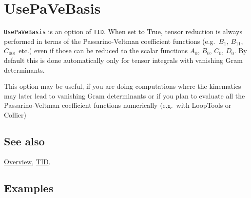 \documentclass[../FeynCalcManual.tex]{subfiles}
\begin{document}
\hypertarget{usepavebasis}{%
\section{UsePaVeBasis}\label{usepavebasis}}

\texttt{UsePaVeBasis} is an option of \texttt{TID}. When set to True,
tensor reduction is always performed in terms of the Passarino-Veltman
coefficient functions (e.g.~\(B_1\), \(B_{11}\), \(C_{001}\) etc.) even
if those can be reduced to the scalar functions \(A_0\), \(B_0\),
\(C_0\), \(D_0\). By default this is done automatically only for tensor
integrals with vanishing Gram determinants.

This option may be useful, if you are doing computations where the
kinematics may later lead to vanishing Gram determinants or if you plan
to evaluate all the Passarino-Veltman coefficient functions numerically
(e.g.~with LoopTools or Collier)

\subsection{See also}

\hyperlink{toc}{Overview}, \hyperlink{tid}{TID}.

\subsection{Examples}
\end{document}
